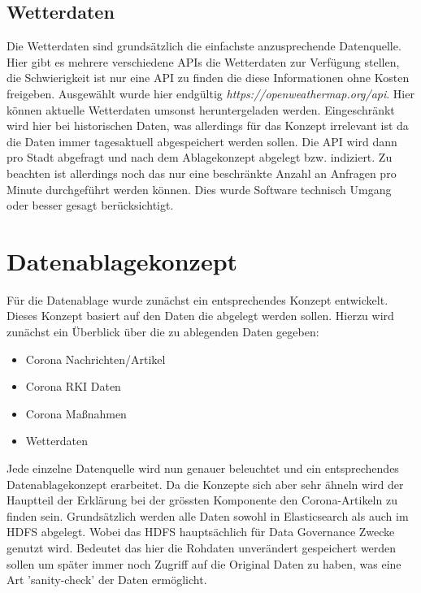 \documentclass[12pt,oneside,a4paper,parskip]{scrbook}
\begin{document}
\section{Wetterdaten}
Die Wetterdaten sind grunds\"atzlich die einfachste anzusprechende Datenquelle. Hier gibt es mehrere verschiedene APIs die Wetterdaten zur Verfügung stellen, die Schwierigkeit ist nur eine API zu finden die diese Informationen ohne Kosten freigeben.
Ausgew\"ahlt wurde hier endg\"ultig \textit{https://openweathermap.org/api}. Hier k\"onnen aktuelle Wetterdaten umsonst heruntergeladen werden. Eingeschr\"ankt wird hier bei historischen Daten, was allerdings f\"ur das Konzept irrelevant ist da die Daten immer tagesaktuell abgespeichert werden sollen. \newline
Die API wird dann pro Stadt abgefragt und nach dem Ablagekonzept abgelegt bzw. indiziert. Zu beachten ist allerdings noch das nur eine beschr\"ankte Anzahl an Anfragen pro Minute durchgef\"uhrt werden k\"onnen. Dies wurde Software technisch Umgang oder besser gesagt ber\"ucksichtigt.
\chapter{Datenablagekonzept}
F\"ur die Datenablage wurde zun\"achst ein entsprechendes Konzept entwickelt. Dieses Konzept basiert auf den Daten die abgelegt werden sollen. Hierzu wird zun\"achst ein \"Uberblick \"uber die zu ablegenden Daten gegeben:
\begin{itemize}
	\item Corona Nachrichten/Artikel
	\item Corona RKI Daten
	\item Corona Maßnahmen
	\item Wetterdaten
\end{itemize}
Jede einzelne Datenquelle wird nun genauer beleuchtet und ein entsprechendes Datenablagekonzept erarbeitet. Da die Konzepte sich aber sehr \"ahneln wird der Hauptteil der Erkl\"arung bei der gr\"ossten Komponente den Corona-Artikeln zu finden sein. Grunds\"atzlich werden alle Daten sowohl in Elasticsearch als auch im HDFS abgelegt. Wobei das HDFS haupts\"achlich f\"ur Data Governance Zwecke genutzt wird. Bedeutet das hier die Rohdaten unver\"andert gespeichert werden sollen um sp\"ater immer noch Zugriff auf die Original Daten zu haben, was eine Art 'sanity-check' der Daten erm\"oglicht.
\end{document}
